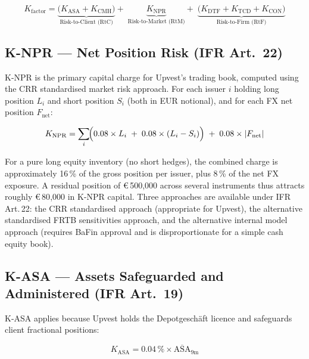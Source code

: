\documentclass[12pt,a4paper]{report}
\newcommand{\eur}{\euro\,}
\begin{document}
\begin{equation}
  K_{\text{factor}} =
    \underbrace{\bigl(K_{\text{ASA}} + K_{\text{CMH}}\bigr)}_{\text{Risk-to-Client (RtC)}}
    +\;
    \underbrace{K_{\text{NPR}}}_{\text{Risk-to-Market (RtM)}}
    +\;
    \underbrace{\bigl(K_{\text{DTF}} + K_{\text{TCD}} + K_{\text{CON}}\bigr)}_{\text{Risk-to-Firm (RtF)}}
  \label{eq:kfactor}
\end{equation}

\subsection{K-NPR --- Net Position Risk (IFR Art.\ 22)}

K-NPR is the primary capital charge for Upvest's trading book, computed using the
CRR standardised market risk approach. For each issuer $i$ holding long position $L_i$
and short position $S_i$ (both in EUR notional), and for each FX net position
$F_{\text{net}}$:

\begin{equation}
  K_{\text{NPR}} = \sum_{i}\!\Bigl(0.08 \times L_i \;+\; 0.08 \times (L_i - S_i)\Bigr)
  \;+\; 0.08 \times \lvert F_{\text{net}} \rvert
  \label{eq:knpr}
\end{equation}

For a pure long equity inventory (no short hedges), the combined charge is approximately
16\,\% of the gross position per issuer, plus 8\,\% of the net FX exposure. A residual
position of \eur{}500{,}000 across several instruments thus attracts roughly
\eur{}80{,}000 in K-NPR capital. Three approaches are available under
IFR\,Art.\,22: the CRR standardised approach (appropriate for Upvest), the alternative
standardised FRTB sensitivities approach, and the alternative internal model approach
(requires BaFin approval and is disproportionate for a simple cash equity book).

\subsection{K-ASA --- Assets Safeguarded and Administered (IFR Art.\ 19)}

K-ASA applies because Upvest holds the Depotgesch{\"a}ft licence and safeguards client
fractional positions:

\begin{equation}
  K_{\text{ASA}} = 0.04\,\% \times \overline{\text{ASA}}_{9\text{m}}
  \label{eq:kasa}
\end{equation}
\end{document}
